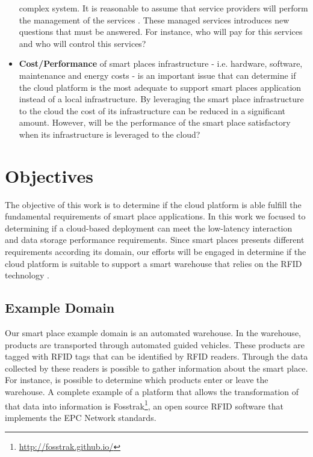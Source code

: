 \begin{itemize}
  complex system. It is reasonable to assume that service providers will perform the management of
  the services . These managed services introduces new questions that must be answered. For instance,
  who will pay for this services and who will control this services?
  \item \textbf{Cost/Performance} of smart places infrastructure - i.e. hardware, software,
  maintenance and energy costs - is an important issue that can determine if the cloud platform is the most
  adequate to support smart places application instead of a local infrastructure. By leveraging the smart
  place infrastructure to the cloud the cost of its infrastructure can be reduced in a significant
  amount. However, will be the performance of the smart place satisfactory when its infrastructure is
  leveraged to the cloud?
\end{itemize}

\section{Objectives}
\label{section:objectives}
The objective of this work is to determine if the cloud platform is able fulfill the fundamental
requirements of smart place applications. In this work we focused to determining if a cloud-based
deployment can meet the low-latency interaction and data storage performance requirements. Since
smart places presents different requirements according its domain, our efforts will be engaged in
determine if the cloud platform is suitable to support a smart warehouse that relies on the RFID
technology \cite{want2006introduction}.\\

\subsection{Example Domain}
\label{sub:domain}
Our smart place example domain is an automated warehouse. In the warehouse, products are transported
through automated guided vehicles. These products are tagged with \gls{RFID} tags that can be identified
by \gls{RFID} readers.  Through the data collected by these readers is possible to gather information
about the smart place. For instance, is possible to determine which products enter or leave the
warehouse. A complete example of a platform that allows the transformation of that data into
information is Fosstrak\footnote{\url{http://fosstrak.github.io/}}, an open source \gls{RFID}
software that implements the \gls{EPC} Network standards.\\


